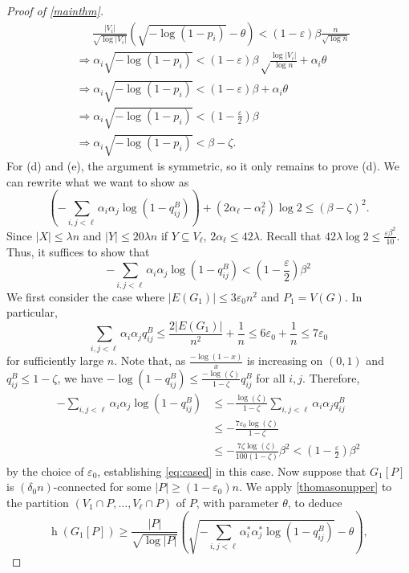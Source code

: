 \documentclass{article}
\newcommand{\eps}{\varepsilon}
\newcommand{\s}[1]{\left(#1\right)}
\DeclareMathOperator{\had}{h}
\begin{document}
\begin{proof}[Proof of \cref{mainthm}]
\begin{align*}
& \quad\:\: \frac{|V_i|}{\sqrt{\log |V_i|}} \s{\sqrt{-\log\s{1-p_i}} - \theta} < (1- \eps) \beta \frac{n}{\sqrt{\log n}} \\
&\Rightarrow \alpha_i \sqrt{-\log\s{1-p_i}} < (1 - \eps) \beta \sqrt\frac{\log|V_i|}{\log n} + \alpha_i \theta \\
&\Rightarrow \alpha_i \sqrt{-\log\s{1-p_i}} < (1 - \eps) \beta + \alpha_i \theta \\
&\Rightarrow \alpha_i \sqrt{-\log\s{1-p_i}} < (1 - \frac\eps2) \beta \\
&\Rightarrow \alpha_i \sqrt{-\log\s{1-p_i}} < \beta - \zeta.
\end{align*}
For (d) and (e), the argument is symmetric, so it only remains to prove (d). We can rewrite what we want to show as
$$\s{-\sum_{i, j < \ell} \alpha_i \alpha_j\log\s{1-q_{ij}^B}} + (2 \alpha_\ell - \alpha_\ell^2) \log2 \leq (\beta - \zeta)^2.$$
Since $|X| \leq \lambda n$ and $|Y| \leq 20 \lambda n$ if $Y \subseteq V_\ell$, $2\alpha_\ell \leq 42 \lambda$. Recall that $42 \lambda \log 2 \leq \frac{\eps \beta^2}{10}$. Thus, it suffices to show that
\begin{equation}\label{eq:cased}
-\sum_{i, j < \ell} \alpha_i \alpha_j \log\s{1-q_{ij}^B} < \s{1-\frac\eps2}\beta^2
\end{equation}
We first consider the case where $|E(G_1)| \leq 3 \eps_0 n^2$ and $P_1 = V(G)$. In particular,
$$\sum_{i, j < \ell} \alpha_i \alpha_j q_{ij}^B \leq \frac{2|E(G_1)|}{n^2} + \frac1n \leq 6 \eps_0 + \frac 1n \leq 7 \eps_0$$
for sufficiently large $n$. Note that, as $\frac{-\log(1-x)}x$ is increasing on $(0, 1)$ and $q_{ij}^B \leq 1 - \zeta$, we have $-\log(1-q_{ij}^B) \leq \frac{-\log(\zeta)}{1-\zeta} q_{ij}^B$ for all $i, j$. Therefore,
\begin{align*}
- \sum_{i, j < \ell} \alpha_i \alpha_j \log(1-q_{ij}^B) &\leq -\frac{\log(\zeta)}{1-\zeta} \sum_{i, j < \ell} \alpha_i \alpha_j q_{ij}^B \\
&\leq -\frac{7 \eps_0 \log(\zeta)}{1-\zeta} \\
&\leq -\frac{7\zeta\log(\zeta)}{100(1-\zeta)}\beta^2 < (1 - \frac \eps2) \beta^2
\end{align*}
by the choice of $\eps_0$, establishing \eqref{eq:cased} in this case. Now suppose that $G_1[P]$ is $(\delta_0 n)$-connected for some $|P| \geq (1-\eps_0)n$. We apply \cref{thomasonupper} to the partition $(V_1 \cap P, \ldots, V_\ell \cap P)$ of $P$, with parameter $\theta$, to deduce
$$\had(G_1[P]) \geq \frac{|P|}{\sqrt{\log |P|}} \s{\sqrt{-\sum_{i, j < \ell} \alpha_i^* \alpha_j^* \log(1-q^B_{ij})} - \theta},$$

\end{proof}
\end{document}
